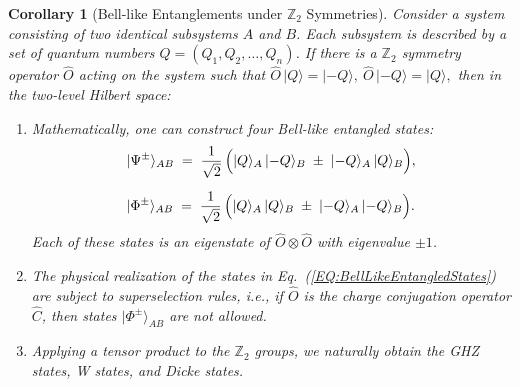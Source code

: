 \documentclass[12pt,a4paper]{article}
\newtheorem{corollary}{Corollary}
\begin{document}
\begin{corollary}[Bell-like Entanglements under $\mathbb{Z}_{2}$ Symmetries]
	\label{COL:DiscreteSymmetryAndEntanglement}
	Consider a system consisting of two identical subsystems $A$ and $B$.
	Each subsystem is described by a set of quantum numbers $Q = (Q_1, Q_2, \dots, Q_n)$.
	If there is a $\mathbb{Z}_{2}$ symmetry operator $\hat{O}$ acting on the system such that
	$
	\hat{O}\,\lvert Q\rangle = \lvert -Q\rangle, 
	~
	\hat{O}\,\lvert -Q\rangle = \lvert Q\rangle,
	$
	then in the two-level Hilbert space:
	\begin{enumerate}
		\item Mathematically, one can construct four Bell-like entangled states:
		\begin{align}\label{EQ:BellLikeEntangledStates}
			\begin{aligned}
				&\lvert \Psi^{\pm} \rangle_{AB}
				\;=\;
				\frac{1}{\sqrt{2}}\,
				\Bigl(
				\lvert Q \rangle_A \,\lvert -Q \rangle_B
				\;\pm\;
				\lvert -Q \rangle_A \,\lvert Q \rangle_B
				\Bigr), \\[6pt]
				&\lvert \Phi^{\pm} \rangle_{AB}
				\;=\;
				\frac{1}{\sqrt{2}}\,
				\Bigl(
				\lvert Q \rangle_A \,\lvert Q \rangle_B
				\;\pm\;
				\lvert -Q \rangle_A \,\lvert -Q \rangle_B
				\Bigr).
			\end{aligned}
		\end{align}		
		Each of these states is an eigenstate of $\hat{O}\otimes \hat{O}$ with eigenvalue $\pm1$.
		
		\item The physical realization of the states in Eq.~(\ref{EQ:BellLikeEntangledStates}) are subject to superselection rules, i.e., if $\hat{O}$ is the charge conjugation operator $\hat{C}$, then states $\lvert \Phi^{\pm} \rangle_{AB}$ are not allowed.
		
		\item Applying a tensor product to the $\mathbb{Z}_{2}$ groups, we naturally obtain the GHZ states, W states, and Dicke states.
	\end{enumerate}
\end{corollary}
\end{document}
